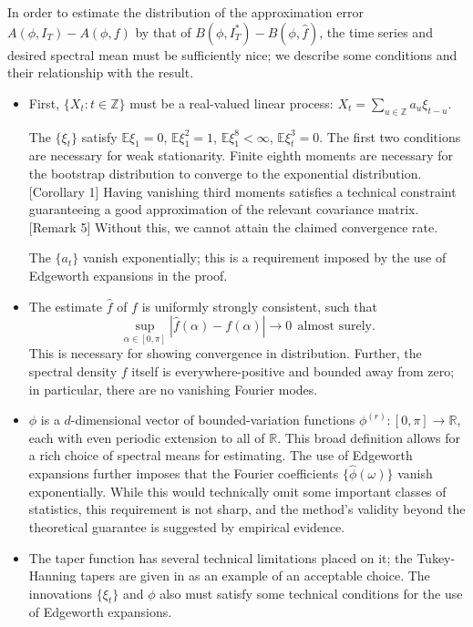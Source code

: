 In order to estimate the distribution of the approximation error $A(\phi,I_T) - A(\phi,f)$ by that of $B(\phi,I_T^*) - B(\phi,\hat f)$, the time series and desired spectral mean must be sufficiently nice; we describe some conditions and their relationship with the result. 
\begin{itemize}[listparindent = 1em]
\item First, $\{X_t:t\in\mathbb Z\}$ must be a real-valued linear process: $X_t = \sum_{u\in\mathbb Z} a_u \xi_{t-u}$.

The $\{\xi_t\}$ satisfy $\mathbb E \xi_1 = 0$, $\mathbb E \xi_1^2 = 1$, $\mathbb E \xi_1^8 <\infty$, $\mathbb E \xi_t^3 = 0$. The first two conditions are necessary for weak stationarity. Finite eighth moments are necessary for the bootstrap distribution to converge to the exponential distribution. \cite{bootstrap}[Corollary 1] Having vanishing third moments satisfies a technical constraint guaranteeing a good approximation of the relevant covariance matrix. \cite{bootstrap}[Remark 5] Without this, we cannot attain the claimed convergence rate. 

The $\{a_t\}$ vanish exponentially; this is a requirement imposed by the use of Edgeworth expansions in the proof.
\item The estimate $\hat f$ of $f$ is uniformly strongly consistent, such that
$$
\sup_{\alpha\in[0,\pi]} |\hat f(\alpha) - f(\alpha)| \to 0 ~~\text{almost surely.}
$$
This is necessary for showing convergence in distribution. Further, the spectral density $f$ itself is everywhere-positive and bounded away from zero; in particular, there are no vanishing Fourier modes. 
\item $\phi$ is a $d$-dimensional vector of bounded-variation functions $\phi^{(r)}:[0,\pi]\to\mathbb R$, each with even periodic extension to all of $\mathbb R$. This broad definition allows for a rich choice of spectral means for estimating. The use of Edgeworth expansions further imposes that the Fourier coefficients $\{\hat \phi (\omega)\}$ vanish exponentially. While this would technically omit some important classes of statistics, this requirement is not sharp, and the method's validity beyond the theoretical guarantee is suggested by empirical evidence. 
\item The taper function has several technical limitations placed on it; the Tukey-Hanning tapers are given in \cite{bootstrap} as an example of an acceptable choice. The innovations $\{\xi_t\}$ and $\phi$ also must satisfy some technical conditions for the use of Edgeworth expansions. 
\end{itemize}

